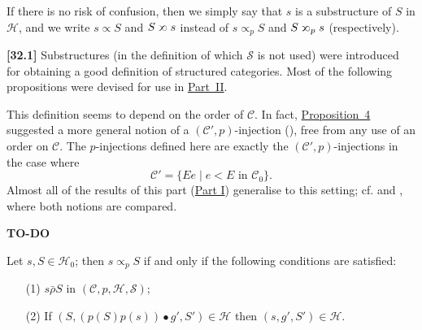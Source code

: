 \documentclass[a4paper,fleqn]{article}
\theoremstyle{plain}
\newenvironment{proposition}[1]
  {\renewcommand\theinnerproposition{#1}\innerproposition}
  {\endinnerproposition}
\theoremstyle{definition}
\newenvironment{longcomm}[1]
  {\noindent\textbf{[#1]}\rmfamily}
  {}
\newcommand{\todo}{{\color{purple}\textbf{TO-DO }}}
\newcommand{\CC}{\mathcal{C}}
\newcommand{\HH}{\mathcal{H}}
\renewcommand{\SS}{\mathcal{S}}
\newcommand{\relrhobar}{\mathrel{\bar{\rho}}}
\newcommand{\subs}{\mathrel{\propto}}
\newcommand{\sups}{\mathrel{\reflectbox{$\propto$}}}
\begin{document}
If there is no risk of confusion, then we simply say that $s$ is a substructure of $S$ in $\HH$, and we write $s\subs S$ and $S\sups s$ instead of $s\subs_p S$ and $S\sups_p s$ (respectively).

\begin{longcomm}{32.1}
  Substructures (in the definition of which $\SS$ is not used) were introduced for obtaining a good definition of structured categories.
  Most of the following propositions were devised for use in \hyperref[section:ii]{Part~II}.

  This definition seems to depend on the order of $\CC$.
  In fact, \hyperref[proposition:i-4]{Proposition~4} suggested a more general notion of a $(\CC',p)$-injection (\cite{coll69,coll66}), free from any use of an order on $\CC$.
  The $p$-injections defined here are exactly the $(\CC',p)$-injections in the case where
  \[
    \CC'
    = \{Ee \mid e<E\text{ in }\CC_0\}.
  \]
  Almost all of the results of this part (\hyperref[section:i]{Part I}) generalise to this setting; cf. \cite{coll66} and \cite{coll69}, where both notions are compared.

  \todo
\end{longcomm}

\begin{proposition}{4}
\label{proposition:i-4}
  Let $s,S\in\HH_0$;
  then $s\subs_p S$ if and only if the following conditions are satisfied:
  \begin{enumerate}
    \item[\normalfont(1\textquotesingle)]
      $s\relrhobar S$ in $(\CC,p,\HH,\SS)$;
    \item[\normalfont(2\textquotesingle)]
      If $(S,(p(S)p(s))\bullet g',S')\in\HH$ then $(s,g',S')\in\HH$.
  \end{enumerate}
\end{proposition}
\end{document}
